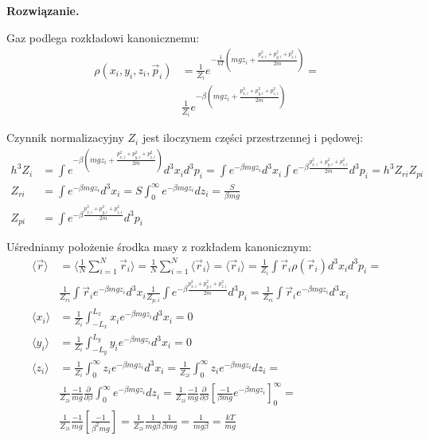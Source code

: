 \documentclass[11pt,a4paper]{article}
\newenvironment{solution}{\vspace{1cm} \par\textbf{Rozwiązanie.} \vspace{1cm}}{}
\begin{document}
\begin{solution}

Gaz podlega rozkładowi kanonicznemu:
\begin{align*}
  \rho(x_{i},y_{i},z_{i}, \vec{p}_i) &=  
  \frac{1}{Z_{i}}e^{-\frac{1}{kT}(mgz_i + \frac{p_{x,i}^2 + p_{y,i}^2 + p_{z,i}^2}{2m})} = \\
   & \frac{1}{Z_{i}}e^{-\beta (mgz_i + \frac{p_{x,i}^2 + p_{y,i}^2 + p_{z,i}^2}{2m})}
\end{align*}

Czynnik normalizacyjny $Z_i$ jest iloczynem części przestrzennej i pędowej:
\begin{align*}
  h^{3}Z_i &=  \int e^{-\beta (mgz_i + \frac{p_{x,i}^2 + p_{y,i}^2 + p_{z,i}^2}{2m})} d^{3}x_i d^{3}p_i =
  \int e^{-\beta mgz_i} d^{3}x_i \int e^{-\beta \frac{p_{x,i}^2 + p_{y,i}^2 + p_{z,i}^2}{2m}} d^{3}p_i = h^{3}Z_{ri} Z_{pi} \\
  Z_{ri} &= \int e^{-\beta mgz_i} d^{3}x_i = S \int_{0}^{\infty} e^{-\beta mgz_i} dz_i = \frac{S}{\beta mg} \\
  Z_{pi} &= \int e^{-\beta \frac{p_{x,i}^2 + p_{y,i}^2 + p_{z,i}^2}{2m}} d^{3}p_i 
\end{align*}


Uśredniamy położenie środka masy z rozkładem kanonicznym:
\begin{align*}
  \langle \vec{r} \rangle &=  \langle \frac{1}{N} \sum_{i=1}^{N} \vec{r}_i \rangle = 
  \frac{1}{N} \sum_{i=1}^{N} \langle\vec{r}_i \rangle = 
  \langle \vec{r}_i \rangle = \frac{1}{Z_i} \int \vec{r}_i \rho(\vec{r}_i) d^{3}x_i d^{3}p_i = \\
   & \frac{1}{Z_{ri}} \int \vec{r}_i e^{-\beta mgz_i} d^{3}x_i  \frac{1}{Z_{p,i}} \int e^{-\beta \frac{p_{x,i}^2 + p_{y,i}^2 + p_{z,i}^2}{2m}} d^{3}p_i = \frac{1}{Z_{ri}} \int \vec{r}_i e^{-\beta mgz_i} d^{3}x_i \\
  \langle x_{i} \rangle &= \frac{1}{Z_i} \int_{-L_{x}}^{L_{x}} x_i e^{-\beta mgz_i} d^{3}x_i = 0 \\
  \langle y_{i} \rangle &= \frac{1}{Z_i} \int_{-L_{y}}^{L_{y}} y_i e^{-\beta mgz_i} d^{3}x_i = 0 \\
  \langle z_{i} \rangle &= \frac{1}{Z_i} \int_{0}^{\infty} z_i e^{-\beta mgz_i} d^{3}x_i = \frac{1}{Z_{zi}} \int_{0}^{\infty} z_i e^{-\beta mgz_i} dz_i = \\
  & \frac{1}{Z_{zi}} \frac{-1}{mg} \frac{\partial}{\partial \beta} \int_{0}^{\infty} e^{-\beta mgz_i} dz_i = \frac{1}{Z_{zi}} \frac{-1}{mg} \frac{\partial}{\partial \beta} \left[ \frac{-1}{\beta mg} e^{-\beta mgz_i} \right]_{0}^{\infty} = \\
  & \frac{1}{Z_{zi}} \frac{-1}{mg} \left[ \frac{-1}{\beta^2 mg} \right] = \frac{1}{Z_{zi}} \frac{1}{mg \beta} \frac{1}{\beta mg}
  = \frac{1}{mg \beta} = \frac{kT}{mg}
\end{align*}


\end{solution}
\end{document}
